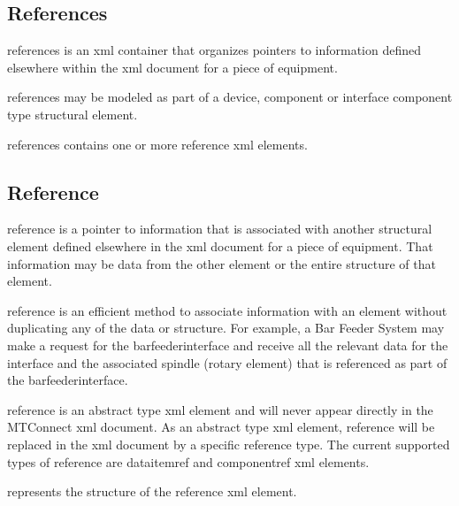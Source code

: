 \subsection{References}
\label{sec:References}

\gls{references} is an \gls{xml} container that organizes pointers to information defined elsewhere within the \gls{xml} document for a piece of equipment.

\gls{references} may be modeled as part of a \gls{device}, \gls{component} or \gls{interface component} type \gls{structural element}.

\gls{references} contains one or more \gls{reference} \gls{xml} elements.



\subsection{Reference}

\gls{reference} is a pointer to information that is associated with another \gls{structural element} defined elsewhere in the \gls{xml} document for a piece of equipment.  That information may be data from the other element or the entire structure of that element.

\gls{reference} is an efficient method to associate information with an element without duplicating any of the data or structure.  For example, a Bar Feeder System may make a request for the \gls{barfeederinterface} and receive all the relevant data for the interface and the associated spindle (\gls{rotary} element) that is referenced as part of the \gls{barfeederinterface}.

\gls{reference} is an abstract type \gls{xml} element and will never appear directly in the MTConnect \gls{xml} document.  As an abstract type \gls{xml} element, \gls{reference} will be replaced in the \gls{xml} document by a specific \gls{reference} type.  The current supported types of \gls{reference} are \gls{dataitemref} and \gls{componentref} \gls{xml} elements.

 represents the structure of the \gls{reference} \gls{xml} element.

